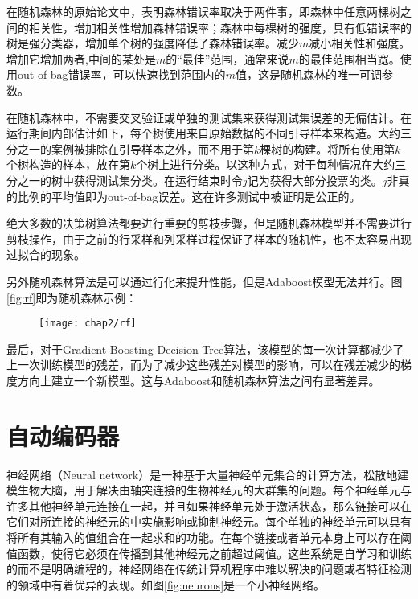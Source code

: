 在随机森林的原始论文中，表明森林错误率取决于两件事，即森林中任意两棵树之间的相关性，增加相关性增加森林错误率；森林中每棵树的强度，具有低错误率的树是强分类器，增加单个树的强度降低了森林错误率。减少$m$减小相关性和强度。增加它增加两者,中间的某处是$m$的“最佳”范围，通常来说$m$的最佳范围相当宽。使用out-of-bag错误率，可以快速找到范围内的$m$值，这是随机森林的唯一可调参数。

在随机森林中，不需要交叉验证或单独的测试集来获得测试集误差的无偏估计。在运行期间内部估计如下，每个树使用来自原始数据的不同引导样本来构造。大约三分之一的案例被排除在引导样本之外，而不用于第$k$棵树的构建。将所有使用第$k$个树构造的样本，放在第$k$个树上进行分类。以这种方式，对于每种情况在大约三分之一的树中获得测试集分类。在运行结束时令$j$记为获得大部分投票的类。$j$非真的比例的平均值即为out-of-bag误差。这在许多测试中被证明是公正的。

绝大多数的决策树算法都要进行重要的剪枝步骤，但是随机森林模型并不需要进行剪枝操作，由于之前的行采样和列采样过程保证了样本的随机性，也不太容易出现过拟合的现象。

另外随机森林算法是可以通过行化来提升性能，但是Adaboost模型无法并行。图\ref{fig:rf}即为随机森林示例：

\begin{figure}[!htp]
    \centering
    \texttt{[image: chap2/rf]}
\end{figure}

最后，对于Gradient Boosting Decision Tree算法，该模型的每一次计算都减少了上一次训练模型的残差，而为了减少这些残差对模型的影响，可以在残差减少的梯度方向上建立一个新模型。这与Adaboost和随机森林算法之间有显著差异。

\section{自动编码器}

神经网络（Neural network）是一种基于大量神经单元集合的计算方法，松散地建模生物大脑，用于解决由轴突连接的生物神经元的大群集的问题。每个神经单元与许多其他神经单元连接在一起，并且如果神经单元处于激活状态，那么链接可以在它们对所连接的神经元的中实施影响或抑制神经元。每个单独的神经单元可以具有将所有其输入的值组合在一起求和的功能。在每个链接或者单元本身上可以存在阈值函数，使得它必须在传播到其他神经元之前超过阈值。这些系统是自学习和训练的而不是明确编程的，神经网络在传统计算机程序中难以解决的问题或者特征检测的领域中有着优异的表现。如图\ref{fig:neurons}是一个小神经网络。

